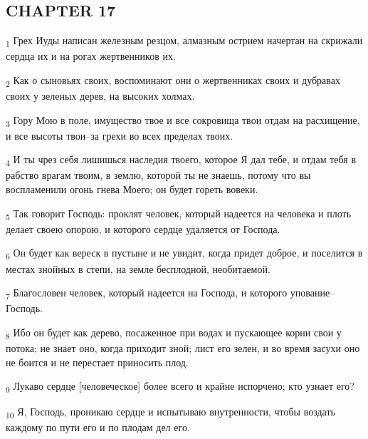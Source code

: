 \subsection{CHAPTER 17}
\begin{tcolorbox}
\textsubscript{1} Грех Иуды написан железным резцом, алмазным острием начертан на скрижали сердца их и на рогах жертвенников их.
\end{tcolorbox}
\begin{tcolorbox}
\textsubscript{2} Как о сыновьях своих, воспоминают они о жертвенниках своих и дубравах своих у зеленых дерев, на высоких холмах.
\end{tcolorbox}
\begin{tcolorbox}
\textsubscript{3} Гору Мою в поле, имущество твое и все сокровища твои отдам на расхищение, и все высоты твои--за грехи во всех пределах твоих.
\end{tcolorbox}
\begin{tcolorbox}
\textsubscript{4} И ты чрез себя лишишься наследия твоего, которое Я дал тебе, и отдам тебя в рабство врагам твоим, в землю, которой ты не знаешь, потому что вы воспламенили огонь гнева Моего; он будет гореть вовеки.
\end{tcolorbox}
\begin{tcolorbox}
\textsubscript{5} Так говорит Господь: проклят человек, который надеется на человека и плоть делает своею опорою, и которого сердце удаляется от Господа.
\end{tcolorbox}
\begin{tcolorbox}
\textsubscript{6} Он будет как вереск в пустыне и не увидит, когда придет доброе, и поселится в местах знойных в степи, на земле бесплодной, необитаемой.
\end{tcolorbox}
\begin{tcolorbox}
\textsubscript{7} Благословен человек, который надеется на Господа, и которого упование--Господь.
\end{tcolorbox}
\begin{tcolorbox}
\textsubscript{8} Ибо он будет как дерево, посаженное при водах и пускающее корни свои у потока; не знает оно, когда приходит зной; лист его зелен, и во время засухи оно не боится и не перестает приносить плод.
\end{tcolorbox}
\begin{tcolorbox}
\textsubscript{9} Лукаво сердце [человеческое] более всего и крайне испорчено; кто узнает его?
\end{tcolorbox}
\begin{tcolorbox}
\textsubscript{10} Я, Господь, проникаю сердце и испытываю внутренности, чтобы воздать каждому по пути его и по плодам дел его.
\end{tcolorbox}
